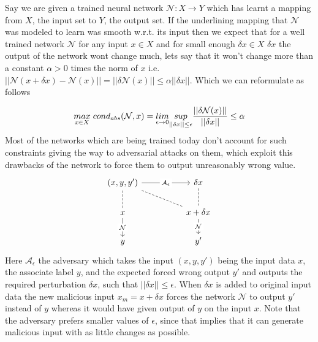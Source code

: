 \newpage
{} \label{problem_defense_adv_nn_attack}

Say we are given a trained neural network $\mathcal{N}: X \to Y$ which has learnt a mapping from $X$, the input set to $Y$, the output set. If the underlining mapping that $\mathcal{N}$ was modeled to learn was smooth w.r.t. its input then we expect that for a well trained network $\mathcal{N}$ for any input $x\in X$ and for small enough $\delta x \in X$  $\delta x$ the output of the network wont change much, lets say that it won't change more than a constant $\alpha > 0$ times the norm of $x$ i.e. $||\mathcal{N}(x+\delta x) - \mathcal{N}(x)|| = ||\delta \mathcal{N}(x)||\le \alpha ||\delta x||$. Which we can reformulate as follows

\begin{equation}
    \underset{x\in X}{max}\hspace{1mm} cond_{abs}(\mathcal{N},x) = \underset{\epsilon \to 0}{lim}\underset{||\delta x||\le \epsilon}{sup} \frac{||\delta \mathcal{N}(x)||}{||\delta x||} \le \alpha
\end{equation}\newline 
Most of the networks which are being trained today don't account for such constraints giving the way to adversarial attacks on them, which exploit this drawbacks of the network to force them to output unreasonably wrong value.
\begin{equation}
\begin{tikzcd}
{(x,y,y')} \arrow[rr, "\mathcal{A}_{\epsilon}" description] \arrow[rrd, no head, dashed] \arrow[d, no head, dashed] &  & \delta x \arrow[d, no head, dashed]\\
x \arrow[d, "\mathcal{N}" description] &  & x+\delta x \arrow[d, "\mathcal{N}" description] \\
y& & y'
\end{tikzcd}
\end{equation}\newline
Here $\mathcal{A}_{\epsilon}$ the adversary which takes the input $(x,y,y')$ being the input data $x$, the associate label $y$, and the expected forced wrong output $y'$ and outputs the required perturbation $\delta x$, such that $||\delta x|| \le \epsilon$. When $\delta x$ is added to original input data the new malicious input $x_m = x + \delta x$ forces the network $\mathcal{N}$ to output $y'$ instead of $y$ whereas it would have given output of $y$ on the input $x$. Note that the adversary prefers smaller values of $\epsilon$, since that implies that it can generate malicious input with as little changes as possible.\newline
